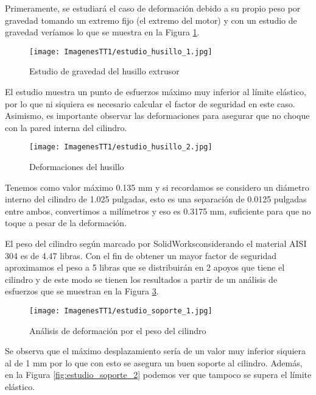 \documentclass[14pt,oneside]{extarticle} %
\begin{document}
Primeramente, se estudiará el caso de deformación debido a su propio peso por gravedad tomando un extremo fijo (el extremo del motor) y con un estudio de gravedad veríamos lo que se muestra en la Figura \ref{fig:estudio_husillo_1}.

\begin{figure}[H]
    \centering
    \texttt{[image: ImagenesTT1/estudio\_husillo\_1.jpg]}
    \caption{Estudio de gravedad del husillo extrusor}
    \label{fig:estudio_husillo_1}
\end{figure}

El estudio muestra un punto de esfuerzos máximo muy inferior al límite elástico, por lo que ni siquiera es necesario calcular el factor de seguridad en este caso. Asimismo, es importante observar las deformaciones para asegurar que no choque con la pared interna del cilindro.

\begin{figure}[H]
    \centering
    \texttt{[image: ImagenesTT1/estudio\_husillo\_2.jpg]}
    \caption{Deformaciones del husillo}
    \label{fig:estudio_husillo_2}
\end{figure}

Tenemos como valor máximo 0.135 mm y si recordamos se considero un diámetro interno del cilindro de 1.025 pulgadas, esto es una separación de 0.0125 pulgadas entre ambos, convertimos a milímetros y eso es 0.3175 mm, suficiente para que no toque a pesar de la deformación.

\newpage

El peso del cilindro según marcado por SolidWorks\textregistered considerando el material AISI 304 es de 4.47 libras. Con el fin de obtener un mayor factor de seguridad aproximamos el peso a 5 libras que se distribuirán en 2 apoyos que tiene el cilindro y de este modo se tienen los resultados a partir de un análisis de esfuerzos que se muestran en la Figura \ref{fig:estudio_soporte_1}.

\begin{figure}[H]
    \centering
    \texttt{[image: ImagenesTT1/estudio\_soporte\_1.jpg]}
    \caption{Análisis de deformación por el peso del cilindro}
    \label{fig:estudio_soporte_1}
\end{figure}

\vspace{-1cm}

Se observa que el máximo desplazamiento sería de un valor muy inferior siquiera al de 1 mm por lo que con esto se asegura un buen soporte al cilindro.  Además, en la Figura \ref{fig:estudio_soporte_2} podemos ver que tampoco se supera el límite elástico.
\end{document}
